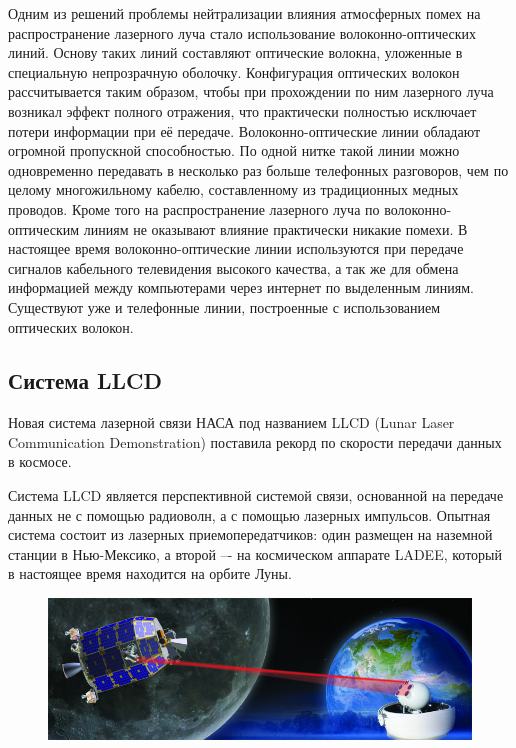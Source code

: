 \documentclass[14pt,pscyr,titlepage]{hedreport}
\begin{document}
		Одним из решений проблемы нейтрализации влияния атмосферных помех на 
		распространение лазерного луча стало использование 
		волоконно-оптических линий. Основу таких линий составляют оптические 
		волокна, уложенные в специальную непрозрачную оболочку. Конфигурация 
		оптических волокон рассчитывается таким образом, чтобы при прохождении 
		по ним лазерного луча возникал эффект полного отражения, что 
		практически полностью исключает потери информации при её передаче. 
		Волоконно-оптические линии обладают огромной пропускной способностью. 
		По одной нитке такой линии можно одновременно передавать в несколько 
		раз больше телефонных разговоров, чем по целому многожильному кабелю, 
		составленному из традиционных медных проводов. Кроме того на 
		распространение лазерного луча по волоконно-оптическим линиям не 
		оказывают влияние практически никакие помехи. В настоящее время 
		волоконно-оптические линии используются при передаче сигналов кабельного 
		телевидения высокого качества, а так же для обмена информацией между 
		компьютерами через интернет по выделенным линиям. Существуют уже и 
		телефонные линии, построенные с использованием оптических волокон.

	\subsection{Система LLCD}
		Новая система лазерной связи НАСА под названием LLCD 
		(Lunar Laser Communication Demonstration) поставила рекорд 
		по скорости передачи данных в космосе.

		Система LLCD является перспективной системой связи, основанной на 
		передаче данных не с помощью радиоволн, а с помощью лазерных 
		импульсов. Опытная система состоит из лазерных приемопередатчиков: 
		один размещен на наземной станции в Нью-Мексико, а второй –- на 
		космическом аппарате LADEE, который в настоящее время находится на 
		орбите Луны.

		\begin{figure}[!ht]
			\center
			\includegraphics[width=.8\textwidth]{llcd_01} \\
		\end{figure}
\end{document}
